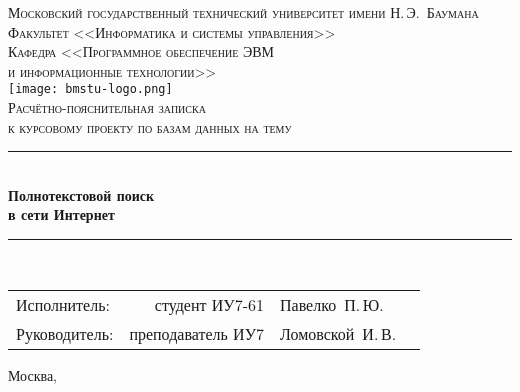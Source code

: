 \newcommand{\HRule}{\rule{\linewidth}{.5mm}\\}

\begin{center}

\textsc{\large Московский государственный технический университет имени Н.\,Э.~Баумана}\\[5mm]
\textsc{Факультет <<Информатика и системы управления>>}\\
\textsc{Кафедра <<Программное обеспечение ЭВМ\\и информационные технологии>>}\\[2.5mm]

\texttt{[image: bmstu-logo.png]}\\[2.25cm]

\textsc{\large Расчётно-пояснительная записка}\\
\textsc{к курсовому проекту по базам данных на тему}

\HRule
{\huge \bfseries Полнотекстовой поиск\\в сети Интернет}
\HRule

\vfill

\begin{flushright}
  \begin{tabular}{lrlc}
    Исполнитель:  &    студент ИУ7-61 & Павелко~П.\,Ю.   & \underline{\hspace{3cm}}\\[1cm]
    Руководитель: & преподаватель ИУ7 & Ломовской~И.\,В. & \underline{\hspace{3cm}}\\[1cm]
  \end{tabular}
\end{flushright}

{\large Москва, \the\year}

\end{center}

\newpage
{}
